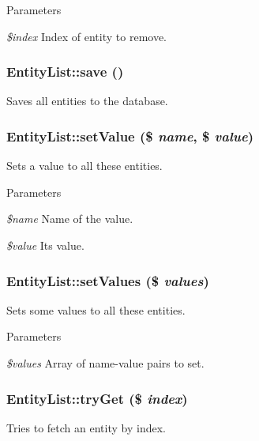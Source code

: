 \begin{DoxyParams}{Parameters}
\item[{\em \$index}]Index of entity to remove. \end{DoxyParams}
\hypertarget{classEntityList_af2c7d6e2bfa78d6af8d7357dd49e5d4b}{
\subsubsection[{save}]{\setlength{\rightskip}{0pt plus 5cm}EntityList::save ()}}
\label{classEntityList_af2c7d6e2bfa78d6af8d7357dd49e5d4b}
Saves all entities to the database. \hypertarget{classEntityList_a66784d8f928108863442c7429932c247}{
\subsubsection[{setValue}]{\setlength{\rightskip}{0pt plus 5cm}EntityList::setValue (\$ {\em name}, \/  \$ {\em value})}}
\label{classEntityList_a66784d8f928108863442c7429932c247}
Sets a value to all these entities.


\begin{DoxyParams}{Parameters}
\item[{\em \$name}]Name of the value. \item[{\em \$value}]Its value. \end{DoxyParams}
\hypertarget{classEntityList_a041e92de11dad274df94247c3c1537c4}{
\subsubsection[{setValues}]{\setlength{\rightskip}{0pt plus 5cm}EntityList::setValues (\$ {\em values})}}
\label{classEntityList_a041e92de11dad274df94247c3c1537c4}
Sets some values to all these entities.


\begin{DoxyParams}{Parameters}
\item[{\em \$values}]Array of name-\/value pairs to set. \end{DoxyParams}
\hypertarget{classEntityList_a110854b1b33f521cb3c3f2f8de786177}{
\subsubsection[{tryGet}]{\setlength{\rightskip}{0pt plus 5cm}EntityList::tryGet (\$ {\em index})}}
\label{classEntityList_a110854b1b33f521cb3c3f2f8de786177}
Tries to fetch an entity by index.


